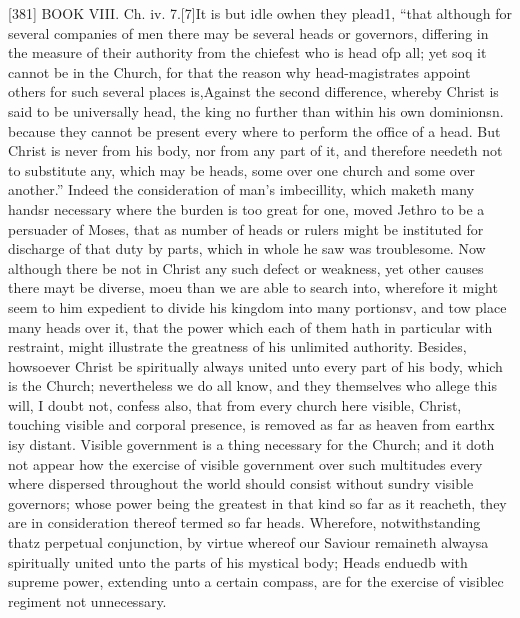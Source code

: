 [381]
BOOK VIII. Ch. iv. 7.[7]It is but idle owhen they plead1, “that although for several companies of men there may be several heads or governors, differing in the measure of their authority from the chiefest who is head ofp all; yet soq it cannot be in the Church, for that the reason why head-magistrates appoint others for such several places is,Against the second difference, whereby Christ is said to be universally head, the king no further than within his own dominionsn. because they cannot be present every where to perform the office of a head. But Christ is never from his body, nor from any part of it, and therefore needeth not to substitute any, which may be heads, some over one church and some over another.” Indeed the consideration of man’s imbecillity, which maketh many handsr necessary where the burden is too great for one, moved Jethro to be a persuader of Moses, that as number of heads or rulers might be instituted for discharge of that duty by parts, which in whole he saw was troublesome. Now although there be not in Christ any such defect or weakness, yet other causes there mayt be diverse, moeu than we are able to search into, wherefore it might seem to him expedient to divide his kingdom into many portionsv, and tow place many heads over it, that the power which each of them hath in particular with restraint, might illustrate the greatness of his unlimited authority. Besides, howsoever Christ be spiritually always united unto every part of his body, which is the Church; nevertheless we do all know, and they themselves who allege this will, I doubt not, confess also, that from every church here visible, Christ, touching visible and corporal presence, is removed as far as heaven from earthx isy distant. Visible government is a thing necessary for the Church; and it doth not appear how the exercise of visible government over such multitudes every where dispersed throughout the world should consist without sundry visible governors; whose power being the greatest in that kind so far as it reacheth, they are in consideration thereof termed so far heads. Wherefore, notwithstanding thatz perpetual conjunction, by virtue whereof our Saviour remaineth alwaysa spiritually united unto the parts of his mystical body; Heads enduedb with supreme power, extending unto a certain compass, are for the exercise of visiblec regiment not unnecessary.

